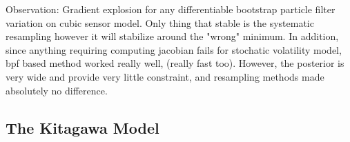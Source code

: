 \documentclass{article}
\begin{document}



Observation: Gradient explosion for any differentiable bootstrap particle filter variation on cubic sensor model. Only thing that stable is the systematic resampling however it will stabilize around the "wrong" minimum. In addition, since anything requiring computing jacobian fails for stochatic volatility model, bpf based method worked really well,  (really fast too). However, the posterior is very wide and provide very little constraint, and resampling methods made absolutely no difference. 


\subsection{The Kitagawa Model}
\end{document}
